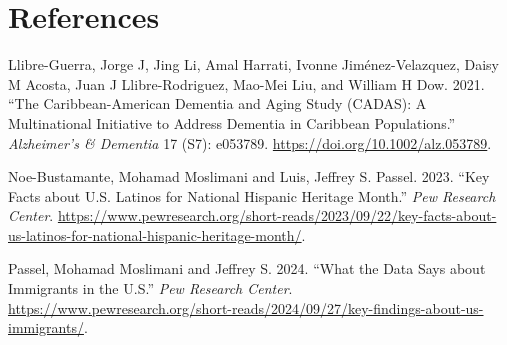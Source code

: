 \documentclass[
]{article}
\newlength{\cslhangindent}
\newenvironment{CSLReferences}[2] %
 {\begin{list}{}{%
  \setlength{\itemindent}{0pt}
  \setlength{\leftmargin}{0pt}
  \setlength{\parsep}{0pt}
  \ifodd #1
   \setlength{\leftmargin}{\cslhangindent}
   \setlength{\itemindent}{-1\cslhangindent}
  \fi
  \setlength{\itemsep}{#2\baselineskip}}}
 {\end{list}}
\begin{document}
\newpage

\section*{References}\label{references}

\label{refs}
\begin{CSLReferences}{1}{0}
Llibre-Guerra, Jorge J, Jing Li, Amal Harrati, Ivonne Jiménez-Velazquez,
Daisy M Acosta, Juan J Llibre-Rodriguez, Mao-Mei Liu, and William H Dow.
2021. {``The {Caribbean}-{American} {Dementia} and {Aging} {Study}
({CADAS}): {A} Multinational Initiative to Address Dementia in
{Caribbean} Populations.''} \emph{Alzheimer's \& Dementia} 17 (S7):
e053789. \url{https://doi.org/10.1002/alz.053789}.

Noe-Bustamante, Mohamad Moslimani and Luis, Jeffrey S. Passel. 2023.
{``Key Facts about {U}.{S}. {Latinos} for {National} {Hispanic}
{Heritage} {Month}.''} \emph{Pew Research Center}.
\url{https://www.pewresearch.org/short-reads/2023/09/22/key-facts-about-us-latinos-for-national-hispanic-heritage-month/}.

Passel, Mohamad Moslimani and Jeffrey S. 2024. {``What the Data Says
about Immigrants in the {U}.{S}.''} \emph{Pew Research Center}.
\url{https://www.pewresearch.org/short-reads/2024/09/27/key-findings-about-us-immigrants/}.

\end{CSLReferences}
\end{document}
